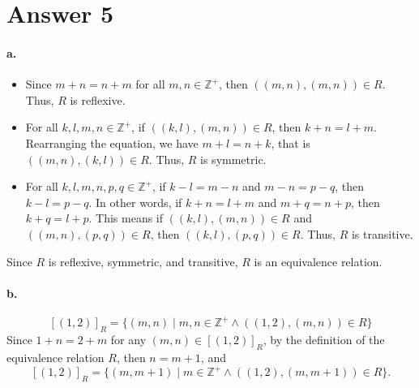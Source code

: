 \documentclass[11pt]{article}
\begin{document}
\section*{Answer 5}
\paragraph{a.}
\begin{itemize}
    \item Since $m + n = n + m$ for all $m, n \in \mathbb{Z}^+$, then $((m, n), (m, n)) \in R$. Thus, $R$ is reflexive.
    \item For all $k, l, m, n \in \mathbb{Z}^+$, if $((k, l), (m, n)) \in R$, then $k + n = l + m$. Rearranging the equation, we have $m + l = n + k$, that is $((m, n), (k, l)) \in R$. Thus, $R$ is symmetric.
    \item For all $k, l, m, n, p, q \in \mathbb{Z}^+$, if $k - l = m - n$ and $m - n = p - q$, then $k - l = p - q$. In other words, if $k + n = l + m$ and $m + q = n + p$, then $k + q = l + p$. This means if $((k, l), (m, n)) \in R$ and $((m, n), (p, q)) \in R$, then $((k, l), (p, q)) \in R$. Thus, $R$ is transitive.
\end{itemize}
Since $R$ is reflexive, symmetric, and transitive, $R$ is an equivalence relation.

\paragraph{b.}
\[ [(1, 2)]_R = \{(m, n) \mid m, n \in \mathbb{Z}^+ \wedge ((1, 2), (m, n)) \in R\} \]
Since $1 + n = 2 + m$ for any $(m, n) \in [(1, 2)]_R$, by the definition of the equivalence relation $R$, then $n = m + 1$, and
\[ [(1, 2)]_R = \{(m, m + 1) \mid m \in \mathbb{Z}^+ \wedge ((1, 2), (m, m + 1)) \in R\}. \]
\end{document}
